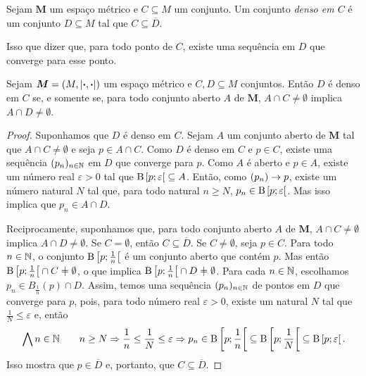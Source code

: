 \begin{definition}
	Sejam $\bm M$ um espaço métrico e $C \subseteq M$ um conjunto. Um conjunto \emph{denso em $C$} é um conjunto $D \subseteq M$ tal que $C \subseteq \overline D$.
\end{definition}

	Isso que dizer que, para todo ponto de $C$, existe uma sequência em $D$ que converge para esse ponto.
	
\begin{proposition}
	Sejam $\bm M = (M,\left\vert{\bm{\cdot}},{\bm{\cdot}}\right\vert)$ um espaço métrico e $C,D \subseteq M$ conjuntos. Então $D$ é denso em $C$ se, e somente se, para todo conjunto aberto $A$ de $\bm M$, $A \cap C \neq \emptyset$ implica $A \cap D \neq \emptyset$.
\end{proposition}
\begin{proof}
	Suponhamos que $D$ é denso em $C$. Sejam $A$ um conjunto aberto de $\bm M$ tal que $A \cap C \neq \emptyset$ e seja $p \in A \cap C$. Como $D$ é denso em $C$ e $p \in C$, existe uma sequência $(p_n)_{n \in \mathbb{N}}$ em $D$ que converge para $p$. Como $A$ é aberto e $p \in A$, existe um número real $\varepsilon>0$ tal que $\mathrm{B}\left[{p};{\varepsilon}\right[ \subseteq A$. Então, como $(p_n) \rightarrow p$, existe um número natural $N$ tal que, para todo natural $n \geq N$, $p_n \in \mathrm{B}\left[{p};{\varepsilon}\right[$. Mas isso implica que $p_n \in A \cap D$.
	
	Reciprocamente, suponhamos que, para todo conjunto aberto $A$ de $\bm M$, $A \cap C \neq \emptyset$ implica $A \cap D \neq \emptyset$. Se $C=\emptyset$, então $C \subseteq \overline D$. Se $C \neq \emptyset$, seja $p \in C$. Para todo $n \in \mathbb{N}$, o conjunto $\mathrm{B}\left[{p};{\frac{1}{n}}\right[$ é um conjunto aberto que contém $p$. Mas então $\bola{p}{\frac{1}{n}} \cap C \neq \emptyset$, o que implica $\bola{p}{\frac{1}{n}} \cap D \neq \emptyset$. Para cada $n \in \mathbb{N}$, escolhamos $p_n \in B_\frac{1}{n}(p) \cap D$. Assim, temos uma sequência $(p_n)_{n \in \mathbb{N}}$ de pontos em $D$ que converge para $p$, pois, para todo número real $\varepsilon>0$, existe um natural $N$ tal que $\frac{1}{N} \leq \varepsilon$ e, então
	\begin{equation*}
	\bigwedge\nolimits n \in \mathbb{N} \qquad n \geq N \Rightarrow \frac{1}{n} \leq \frac{1}{N} \leq \varepsilon \Rightarrow p_n \in \mathrm{B}\left[{p};{\frac{1}{n}}\right[ \subseteq \mathrm{B}\left[{p};{\frac{1}{N}}\right[ \subseteq \mathrm{B}\left[{p};{\varepsilon}\right[.
	\end{equation*}
	Isso mostra que $p \in \overline D$ e, portanto, que $C \subseteq \overline D$.
\end{proof}

